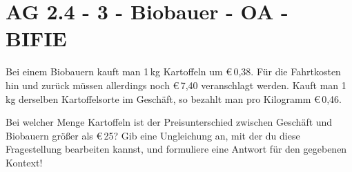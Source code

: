 \section{AG 2.4 - 3 - Biobauer - OA - BIFIE}

\begin{beispiel}[AG 2.4]{1} %
	Bei einem Biobauern kauft man 1\,kg Kartoffeln um \euro\,0,38. Für die Fahrtkosten hin und zurück müssen allerdings noch \euro\,7,40 veranschlagt werden. Kauft man 1\,kg derselben Kartoffelsorte
im Geschäft, so bezahlt man pro Kilogramm \euro\,0,46. 

\leer

Bei welcher Menge Kartoffeln ist der Preisunterschied zwischen Geschäft und Biobauern größer als \euro\,25? Gib eine Ungleichung an, mit der du diese Fragestellung bearbeiten kannst,
und formuliere eine Antwort für den gegebenen Kontext! 

\end{beispiel}